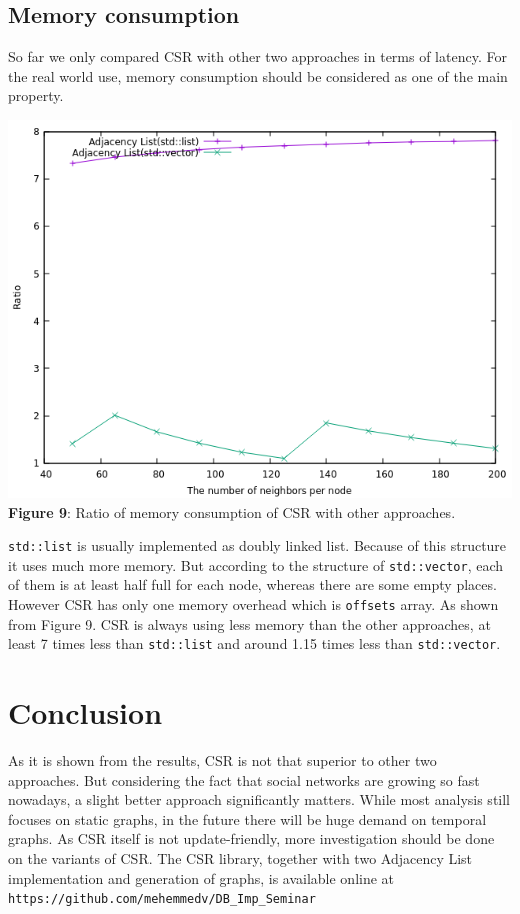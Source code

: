 \documentclass{article}
\begin{document}
\subsection{Memory consumption}
  So far we only compared CSR with other two approaches in terms of latency. For the real world use, memory consumption should be considered as one of the main property. 
 \begin{center}
\includegraphics[scale = 0.48]{mem_ratio}\\
\textbf{Figure 9}: Ratio of memory consumption of CSR with other approaches.
\end{center}
\texttt{std::list} is usually implemented as doubly linked list. Because of this structure it uses much more memory. But according to the structure of \texttt{std::vector}, each of them is at least half full for each node, whereas there are some empty places. However CSR has only one memory overhead which is \texttt{offsets} array. As shown from Figure 9. CSR is always using less memory than the other approaches, at least 7 times less than \texttt{std::list} and around 1.15 times less than \texttt{std::vector}.

\section{Conclusion}
As it is shown from the results, CSR is not that superior to other two approaches. But considering the fact that social networks are growing so fast nowadays, a slight better approach significantly matters. While most analysis still focuses on static graphs, in the future there will be huge demand on temporal graphs. As CSR itself is not update-friendly, more investigation should be done on the variants of CSR. The CSR library, together with two Adjacency List implementation and generation of graphs, is available online at \texttt{https://github.com/mehemmedv/DB\_Imp\_Seminar}\\
\end{document}
